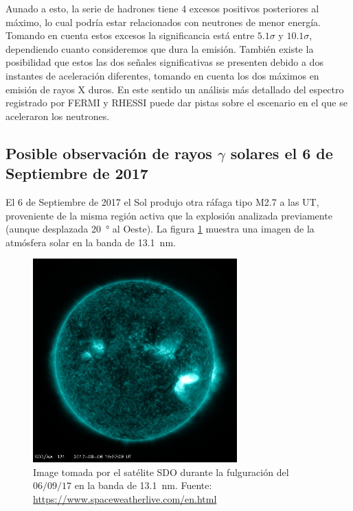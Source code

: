 Aunado a esto, la serie de hadrones tiene \num{4} excesos positivos posteriores al máximo, lo cual podría estar relacionados con neutrones de menor energía. Tomando en cuenta estos excesos la significancia está entre $5.1\sigma$ y $10.1\sigma$, dependiendo cuanto consideremos que dura la emisión. También existe la posibilidad que estos las dos señales significativas se presenten debido a dos instantes de aceleración diferentes, tomando en cuenta los dos máximos en emisión de rayos X duros. En este sentido un análisis más detallado del espectro registrado por FERMI y RHESSI puede dar pistas sobre el escenario en el que se aceleraron los neutrones.

\subsection{Posible observación de rayos $\gamma$ solares el 6 de Septiembre de 2017}

El \num{6} de Septiembre de \num{2017} el Sol produjo otra ráfaga tipo M\num{2.7} a las  UT, proveniente de la misma región activa que la explosión analizada previamente (aunque desplazada \SI{20}{\degree} al Oeste). La figura \ref{fig:september-06-flare} muestra una imagen de la atmósfera solar en la banda de \SI{13.1}{\nano\metre}.

\begin{figure}
        \centering
        \includegraphics[width=0.7\textwidth]{sdo170906-1550-13}
        \caption{Image tomada por el satélite SDO durante la fulguración del $06/09/17$ en la banda de \SI{13.1}{\nano\metre}. Fuente: \url{https://www.spaceweatherlive.com/en.html}}
        \label{fig:september-06-flare}
\end{figure}

